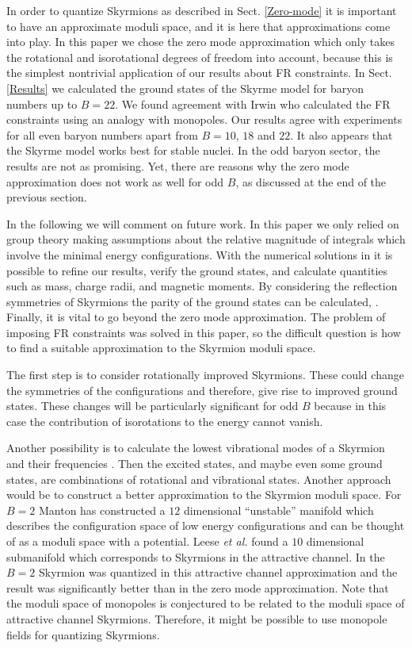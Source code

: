 \documentclass[a4paper,12pt]{article}
\begin{document}
In order to quantize Skyrmions as described in Sect. 
\ref{Zero-mode} it is important to have an approximate moduli space, and 
it is here that approximations come into play. In this paper we chose 
the zero mode approximation which only takes the rotational and 
isorotational degrees of freedom into account, because this is the 
simplest nontrivial application of our results about FR constraints.
In Sect. \ref{Results} we calculated the ground states of the Skyrme 
model for baryon numbers up to $B=22$. 
We found agreement with Irwin \cite{Irwin:1998bs} who calculated the FR 
constraints using an analogy with monopoles. Our results agree with 
experiments for all even baryon numbers apart from $B=10$, $18$ and $22$. 
It also appears that the Skyrme model works best for stable nuclei. In the 
odd baryon sector, the results are not as promising. Yet, there are
reasons why the zero mode approximation does not work as well for odd
$B$, as discussed at the end of the previous section.

In the following we will comment on future work.
In this paper we only relied on group theory making assumptions about 
the relative magnitude of integrals which involve the minimal energy 
configurations. 
With the numerical solutions in \cite{Battye:2001qn} it is possible to 
refine our results, verify the ground states, and calculate quantities 
such as mass, charge radii, and magnetic moments. By considering the 
reflection symmetries of Skyrmions the parity 
of the ground states can be calculated, \cite{Irwin:1998bs}. 
Finally, it is vital to go beyond the zero mode approximation. 
The problem of imposing FR constraints was solved in this paper, so the 
difficult question is how to find a suitable approximation to the Skyrmion 
moduli space. 

The first step is to consider rotationally improved Skyrmions. These could 
change the symmetries of the configurations and therefore, give rise to 
improved  ground states. These changes will be particularly significant 
for odd $B$ because in this case the contribution of isorotations to the 
energy cannot vanish.

Another possibility is to calculate the lowest vibrational modes of a 
Skyrmion and their frequencies \cite{Barnes:1997nc, Barnes:1997qa, 
Baskerville:1999kk, Baskerville:1999ve, Houghton:1999uq}. 
Then the excited states, and maybe even some ground 
states, are combinations of rotational and vibrational states. Another 
approach would be to construct a better approximation to the Skyrmion 
moduli space. 
For $B=2$ Manton has constructed a $12$ dimensional 
``unstable'' manifold \cite{Manton:1988ba}
which describes the configuration space of low energy configurations and 
can be thought of as a moduli space with a potential. Leese {\it et al.} 
found a $10$ dimensional submanifold which corresponds to Skyrmions 
in the attractive channel. In \cite{Leese:1995hb} the $B=2$ Skyrmion was 
quantized in this attractive channel approximation and the result was 
significantly better than in the zero mode approximation.
Note that the moduli space of monopoles is conjectured to be related to 
the moduli space of attractive channel Skyrmions. Therefore, 
it might be possible to use monopole fields for quantizing Skyrmions.
\end{document}
